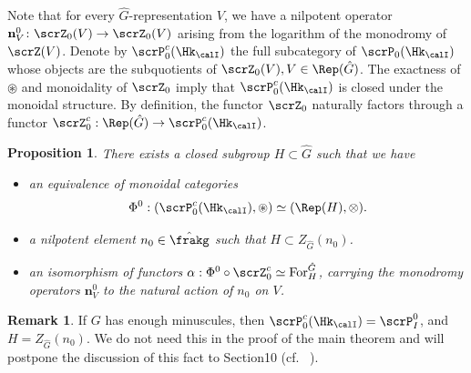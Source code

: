 \documentclass[10pt, reqno]{amsart}
\theoremstyle{plain}
\newtheorem{proposition}[theorem]{Proposition}
\theoremstyle{definition}
\newtheorem{remark}[theorem]{Remark}
\numberwithin{equation}{section}
\begin{document}
Note that for every $\hat{G}$-representation $V$, we have a nilpotent operator $\mathbf{n}^0_V \colon \scrZ_0(V) \to \scrZ_0(V)$ arising from the logarithm of the monodromy of $\scrZ(V)$.
Denote by $\scrP_0^c(\Hk_{\calI})$ the full subcategory of $\scrP_0(\Hk_{\calI})$ whose objects are the subquotients of $\scrZ_0(V), V\in\Rep(\hat{G})$. The exactness of $\circledast$ and monoidality of $\scrZ_0$ imply that $\scrP_0^c(\Hk_{\calI})$ is closed under the monoidal structure. By definition, the functor $\scrZ_0$ naturally factors through a functor $\scrZ_0^c:\Rep(\hat{G})\rightarrow \scrP_0^c(\Hk_{\calI})$.
\begin{proposition}\label{prop_tannakian_for_perv_I0}
	There exists a closed subgroup $H\subset \hat{G}$ such that we have
	\begin{itemize}
		\item [(1)] an equivalence of monoidal categories
		\begin{equation}
			\Phi^0:(\scrP_0^c(\Hk_{\calI}),\circledast)\simeq (\Rep(H),\otimes).
		\end{equation}
		\item[(2)] a nilpotent element $n_0\in\hat{\frakg}$ such that $H\subset Z_{\hat{G}}(n_0)$. 
		\item[(3)] an isomorphism of functors $\alpha:\Phi^0\circ\scrZ^c_0\simeq \mathrm{For}^{\hat{G}}_H$, carrying the monodromy operators $\mathbf{n}_V^0$ to the natural action of $n_0$ on $V$. %
		
		
	\end{itemize}
\end{proposition}

\begin{remark} \label{remark_regular_quotient}
	If $G$ has enough minuscules, then $\scrP_0^c(\Hk_{\calI})=\scrP_I^0$, and $H=Z_{\hat{G}}(n_0)$. We do not need this in the proof of the main theorem and will postpone the discussion of this fact to Section10 (cf.  \ ).
\end{remark}
\end{document}
